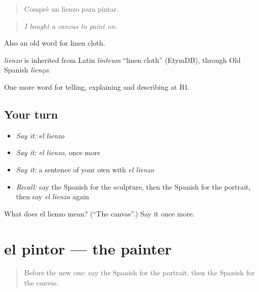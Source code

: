 \begin{quote}
Compré un lienzo para pintar.
\end{quote}

\begin{quote}
\emph{I bought a canvas to paint on.}
\end{quote}

Also an old word for linen cloth.

\begin{cousinweb}
\emph{lienzo} is inherited from Latin \emph{linteum} \textquotedblleft{}linen cloth\textquotedblright{} (EtymDB), through Old Spanish \emph{lienço}.
\end{cousinweb}

\begin{grammarlens}[title={What you've built}]
One more word for telling, explaining and describing at B1.
\end{grammarlens}

\subsection*{Your turn}
\begin{itemize}
\raggedright
  \item \emph{Say it:} \emph{el lienzo}
  \item \emph{Say it:} \emph{el lienzo}, once more
  \item \emph{Say it:} a sentence of your own with \emph{el lienzo}
  \item \emph{Recall:} say the Spanish for the sculpture, then the Spanish for the portrait, then say \emph{el lienzo} again
\end{itemize}

\begin{tcolorbox}[breakable,colback=teal!4,colframe=teal!35!black,title={Before you move on}]
What does el lienzo mean? (\textquotedblleft{}The canvas\textquotedblright{}.) Say it once more.
\end{tcolorbox}
\section[el pintor]{el pintor — the painter}

\label{lesson:ES-C763-pintor}



\begin{quote}
Before the new one: say the Spanish for the portrait, then the Spanish for the canvas.
\end{quote}

